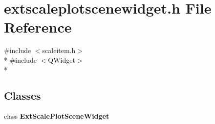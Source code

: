 \section{extscaleplotscenewidget.\+h File Reference}
\label{extscaleplotscenewidget_2extscaleplotscenewidget_8h}
{\ttfamily \#include $<$scaleitem.\+h$>$}\\*
{\ttfamily \#include $<$Q\+Widget$>$}\\*
\subsection*{Classes}
\begin{DoxyCompactItemize}
\item 
class {\bf Ext\+Scale\+Plot\+Scene\+Widget}
\end{DoxyCompactItemize}
